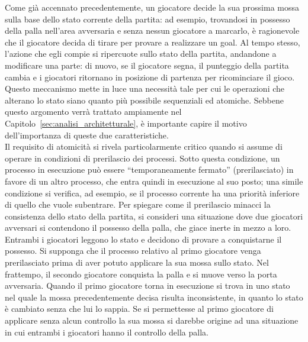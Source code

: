 Come già accennato precedentemente, un giocatore decide la sua prossima mossa sulla base dello stato corrente della partita: ad esempio, trovandosi in possesso della palla nell'area avversaria e senza nessun giocatore a marcarlo, è ragionevole che il giocatore decida di tirare per provare a realizzare un goal. Al tempo stesso, l'azione che egli compie si ripercuote sullo stato della partita, andandone a modificare una parte: di nuovo, se il giocatore segna, il punteggio della partita cambia e i giocatori ritornano in posizione di partenza per ricominciare il gioco. Questo meccanismo mette in luce una necessità tale per cui le operazioni che alterano lo stato siano quanto più possibile sequenziali ed atomiche. Sebbene questo argomento verrà trattato ampiamente nel Capitolo~\ref{sec:analisi_architetturale}, è importante capire il motivo dell'importanza di queste due caratteristiche.\\

Il requisito di atomicità si rivela particolarmente critico quando si assume di operare in condizioni di prerilascio dei processi. Sotto questa condizione, un processo in esecuzione può essere ``temporaneamente fermato'' (prerilasciato) in favore di un altro processo, che entra quindi in esecuzione al suo posto; una simile condizione si verifica, ad esempio, se il processo corrente ha una priorità inferiore di quello che vuole subentrare. Per spiegare come il prerilascio minacci la consistenza dello stato della partita, si consideri una situazione dove due giocatori avversari si contendono il possesso della palla, che giace inerte in mezzo a loro. Entrambi i giocatori leggono lo stato e decidono di provare a conquistarne il possesso. Si supponga che il processo relativo al primo giocatore venga prerilasciato prima di aver potuto applicare la sua mossa sullo stato. Nel frattempo, il secondo giocatore conquista la palla e si muove verso la porta avversaria. Quando il primo giocatore torna in esecuzione si trova in uno stato nel quale la mossa precedentemente decisa risulta inconsistente, in quanto lo stato è cambiato senza che lui lo sappia. Se si permettesse al primo giocatore di applicare senza alcun controllo la sua mossa si darebbe origine ad una situazione in cui entrambi i giocatori hanno il controllo della palla.\\

